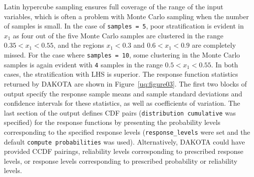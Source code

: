 Latin hypercube sampling ensures full coverage of the range of the
input variables, which is often a problem with Monte Carlo sampling
when the number of samples is small. In the case of \texttt{samples =
5}, poor stratification is evident in $x_1$ as four out of the five
Monte Carlo samples are clustered in the range $0.35 < x_1 < 0.55$,
and the regions $x_1 < 0.3$ and $0.6 < x_1 < 0.9$ are completely
missed. For the case where \texttt{samples = 10}, some clustering in
the Monte Carlo samples is again evident with \texttt{4} samples in
the range $0.5 < x_1 < 0.55$. In both cases, the stratification with
LHS is superior.  The response function statistics returned by DAKOTA
are shown in Figure~\ref{uq:figure03}.  The first two blocks of output
specify the response sample means and sample standard deviations and
confidence intervals for these statistics, as well as coefficients of
variation.  The last section of the output defines CDF pairs
(\texttt{distribution cumulative} was specified) for the response
functions by presenting the probability levels corresponding to the
specified response levels (\texttt{response\_levels} were set and the
default \texttt{compute probabilities} was used).  Alternatively,
DAKOTA could have provided CCDF pairings, reliability levels
corresponding to prescribed response levels, or response levels
corresponding to prescribed probability or reliability levels.

